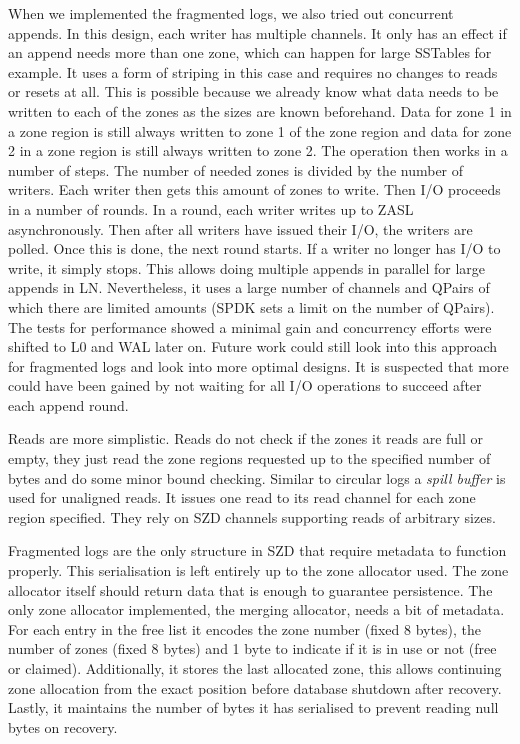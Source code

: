 When we implemented the fragmented logs, we also tried out concurrent appends. In this design, each writer has multiple channels. It only has an effect if an append needs more than one zone, which can happen for large SSTables for example. It uses a form of striping in this case and requires no changes to reads or resets at all. This is possible because we already know what data needs to be written to each of the zones as the sizes are known beforehand. Data for zone 1 in a zone region is still always written to zone 1 of the zone region and data for zone 2 in a zone region is still always written to zone 2. The operation then works in a number of steps. The number of needed zones is divided by the number of writers. Each writer then gets this amount of zones to write. Then I/O proceeds in a number of rounds. In a round, each writer writes up to ZASL asynchronously. Then after all writers have issued their I/O, the writers are polled. Once this is done, the next round starts. If a writer no longer has I/O to write, it simply stops. This allows doing multiple appends in parallel for large appends in LN. Nevertheless, it uses a large number of channels and QPairs of which there are limited amounts (SPDK sets a limit on the number of QPairs). The tests for performance showed a minimal gain and concurrency efforts were shifted to L0 and WAL later on. Future work could still look into this approach for fragmented logs and look into more optimal designs. It is suspected that more could have been gained by not waiting for all I/O operations to succeed after each append round.

Reads are more simplistic. Reads do not check if the zones it reads are full or empty, they just read the zone regions requested up to the specified number of bytes and do some minor bound checking. Similar to circular logs a \textit{spill buffer} is used for unaligned reads. It issues one read to its read channel for each zone region specified. They rely on SZD channels supporting reads of arbitrary sizes.  

Fragmented logs are the only structure in SZD that require metadata to function properly. This serialisation is left entirely up to the zone allocator used. The zone allocator itself should return data that is enough to guarantee persistence. The only zone allocator implemented, the merging allocator, needs a bit of metadata. For each entry in the free list it encodes the zone number (fixed 8 bytes), the number of zones (fixed 8 bytes) and 1 byte to indicate if it is in use or not (free or claimed). Additionally, it stores the last allocated zone, this allows continuing zone allocation from the exact position before database shutdown after recovery. Lastly, it maintains the number of bytes it has serialised to prevent reading null bytes on recovery. 

